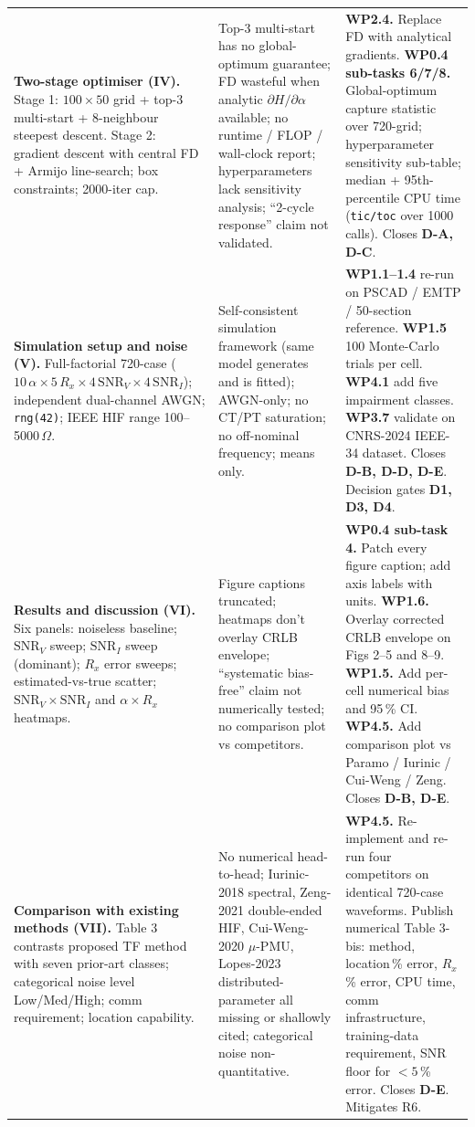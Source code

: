 \documentclass[11pt,a4paper]{article}
\begin{document}
\begin{longtable}{L{4.4cm}L{4.6cm}L{6.0cm}}
\textbf{Two-stage optimiser (IV).}
Stage 1: $100\times50$ grid + top-3 multi-start + 8-neighbour steepest
descent.  Stage 2: gradient descent with central FD + Armijo line-search;
box constraints; 2000-iter cap.
&
Top-3 multi-start has no global-optimum guarantee; FD wasteful when
analytic $\partial H/\partial\alpha$ available;
no runtime / FLOP / wall-clock report; hyperparameters lack sensitivity
analysis; ``2-cycle response'' claim not validated.
&
\textbf{WP2.4.} Replace FD with analytical gradients.
\textbf{WP0.4 sub-tasks 6/7/8.} Global-optimum capture statistic over
720-grid; hyperparameter sensitivity sub-table; median + 95th-percentile
CPU time (\texttt{tic/toc} over 1000 calls).
Closes \textbf{D-A, D-C}.\\

\textbf{Simulation setup and noise (V).}
Full-factorial 720-case ($10\,\alpha\times 5\,R_x\times 4\,\mathrm{SNR}_V
\times 4\,\mathrm{SNR}_I$); independent dual-channel AWGN; \texttt{rng(42)};
IEEE HIF range 100--5000\,$\Omega$.
&
Self-consistent simulation framework (same model generates and is fitted);
AWGN-only; no CT/PT saturation; no off-nominal frequency; means only.
&
\textbf{WP1.1--1.4} re-run on PSCAD / EMTP / 50-section reference.
\textbf{WP1.5} 100 Monte-Carlo trials per cell.
\textbf{WP4.1} add five impairment classes.
\textbf{WP3.7} validate on CNRS-2024 IEEE-34 dataset.
Closes \textbf{D-B, D-D, D-E}.  Decision gates \textbf{D1, D3, D4}.\\

\textbf{Results and discussion (VI).}
Six panels: noiseless baseline; $\mathrm{SNR}_V$ sweep;
$\mathrm{SNR}_I$ sweep (dominant); $R_x$ error sweeps; estimated-vs-true
scatter; $\mathrm{SNR}_V \times \mathrm{SNR}_I$ and
$\alpha \times R_x$ heatmaps.
&
Figure captions truncated; heatmaps don't overlay CRLB envelope;
``systematic bias-free'' claim not numerically tested; no comparison
plot vs competitors.
&
\textbf{WP0.4 sub-task 4.} Patch every figure caption; add axis labels
with units. \textbf{WP1.6.} Overlay corrected CRLB envelope on Figs 2--5
and 8--9. \textbf{WP1.5.} Add per-cell numerical bias and 95\,\% CI.
\textbf{WP4.5.} Add comparison plot vs Paramo / Iurinic / Cui-Weng / Zeng.
Closes \textbf{D-B, D-E}.\\

\textbf{Comparison with existing methods (VII).}
Table 3 contrasts proposed TF method with seven prior-art classes;
categorical noise level Low/Med/High; comm requirement; location
capability.
&
No numerical head-to-head; Iurinic-2018 spectral, Zeng-2021 double-ended
HIF, Cui-Weng-2020 $\mu$-PMU, Lopes-2023 distributed-parameter all
missing or shallowly cited; categorical noise non-quantitative.
&
\textbf{WP4.5.} Re-implement and re-run four competitors on identical
720-case waveforms.  Publish numerical Table 3-bis: method, location\,\%
error, $R_x$\,\% error, CPU time, comm infrastructure, training-data
requirement, SNR floor for $<5$\,\% error.  Closes \textbf{D-E}.
Mitigates R6.\\


\end{longtable}
\end{document}
